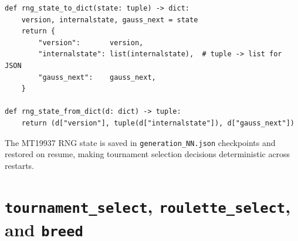 \documentclass[11pt,a4paper]{report}
\newcommand{\fn}[1]{\texttt{#1}}
\begin{document}
\begin{lstlisting}[style=example]
def rng_state_to_dict(state: tuple) -> dict:
    version, internalstate, gauss_next = state
    return {
        "version":       version,
        "internalstate": list(internalstate),  # tuple -> list for JSON
        "gauss_next":    gauss_next,
    }

def rng_state_from_dict(d: dict) -> tuple:
    return (d["version"], tuple(d["internalstate"]), d["gauss_next"])
\end{lstlisting}

The MT19937 RNG state is saved in \fn{generation\_NN.json} checkpoints and restored on
resume, making tournament selection decisions deterministic across restarts.

\section{\fn{tournament\_select}, \fn{roulette\_select}, and \fn{breed}}
\end{document}

